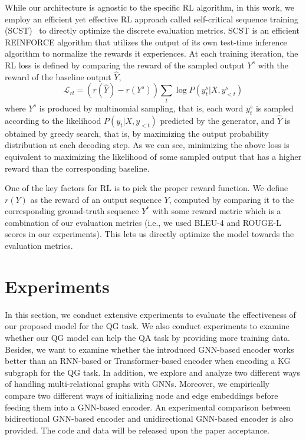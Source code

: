 \documentclass[journal]{IEEEtran}
\begin{document}
While our architecture is agnostic to the specific RL algorithm, in this work, 
we employ an efficient yet effective RL approach called self-critical sequence training (SCST)~\cite{rennie2017self}
to directly optimize the discrete evaluation metrics. 
SCST is an efficient REINFORCE algorithm that utilizes the output of its own test-time inference algorithm to normalize the rewards it experiences.
At each training iteration,
the RL loss is defined by comparing the reward of the sampled output $Y^s$
with the reward of the baseline output $\hat{Y}$, 
\begin{equation}
\mathcal{L}_{rl}=(r(\hat{Y})-r(Y^s)) \sum_{t}{\log{} P(y_t^s|X, y^s_{<t})}
\end{equation}
where $Y^s$ is produced by multinomial sampling, that is, each word $y_t^s$ is sampled according to the likelihood $P(y_t|X, y_{<t})$ predicted by the generator,
and $\hat{Y}$ is obtained by greedy search, that is, by maximizing the output probability distribution at each decoding step.
As we can see,  minimizing the above loss is equivalent to maximizing the likelihood of some sampled output that has a higher reward than the corresponding baseline. 


One of the key factors for RL is to pick the proper reward function.
We define $r(Y)$ as the reward of an output sequence $Y$, computed by comparing it to the corresponding ground-truth sequence $Y^*$ with some reward metric which is 
a combination of our evaluation metrics (i.e., we used BLEU-4 and ROUGE-L scores in our experiments).
This lets us directly optimize the model towards the evaluation metrics.














\section{Experiments}

In this section, we conduct extensive experiments to evaluate the effectiveness of our proposed model for the QG task.
We also conduct experiments to examine whether our QG model can help the QA task by providing more training data.
Besides, we want to examine whether the introduced GNN-based encoder works better than an RNN-based or Transformer-based encoder when encoding a KG subgraph for the QG task.
In addition, we explore and analyze two different ways of handling multi-relational graphs with GNNs.
Moreover, we empirically compare two different ways of initializing node and edge embeddings before feeding them into a GNN-based encoder.
An experimental comparison between bidirectional GNN-based encoder and unidirectional GNN-based encoder is also provided.
The code and data will be released upon the paper acceptance.
\end{document}
